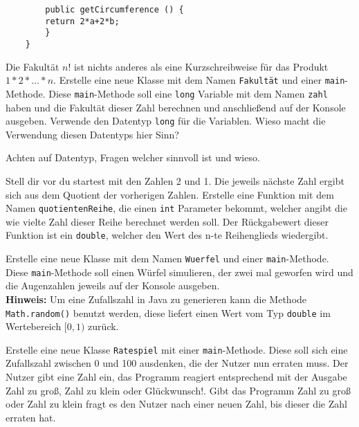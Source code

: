 \begin{questions}
\begin{parts}
\begin{solution}
\begin{lstlisting}
        public getCircumference () {
        return 2*a+2*b;
        }
    }
        \end{lstlisting}
    \end{solution}
\end{parts}

Die Fakultät $n!$ ist nichts anderes als eine Kurzschreibweise für das Produkt $1*2*...*n$.
Erstelle eine neue Klasse mit dem Namen \texttt{Fakult\"at} und einer \texttt{main}-Methode. Diese \texttt{main}-Methode soll eine \texttt{long} Variable mit dem Namen \texttt{zahl} haben und die Fakult\"at dieser Zahl berechnen und anschließend auf der Konsole ausgeben. Verwende den Datentyp \texttt{long} f\"ur die Variablen. Wieso macht die Verwendung diesen Datentyps hier Sinn?

\begin{solution}
    Achten auf Datentyp, Fragen welcher sinnvoll ist und wieso.
\end{solution}

Stell dir vor du startest mit den Zahlen 2 und 1. Die jeweils n\"achste Zahl ergibt sich aus dem Quotient der vorherigen Zahlen. Erstelle eine Funktion mit dem Namen \texttt{quotientenReihe}, die einen \texttt{int} Parameter bekommt, welcher angibt die wie vielte Zahl dieser Reihe berechnet werden soll. Der R\"uckgabewert dieser Funktion ist ein \texttt{double}, welcher den Wert des n-te Reihenglieds wiedergibt.

Erstelle eine neue Klasse mit dem Namen \texttt{Wuerfel} und einer \texttt{main}-Methode. Diese \texttt{main}-Methode soll einen W\"urfel simulieren, der zwei mal geworfen wird und die Augenzahlen jeweils auf der Konsole ausgeben.\\
\textbf{Hinweis:} Um eine Zufallszahl in Java zu generieren kann die Methode \texttt{Math.random()} benutzt werden, diese liefert einen Wert vom Typ \texttt{double} im Wertebereich $[0, 1)$    zur\"uck.

Erstelle eine neue Klasse \texttt{Ratespiel} mit einer \texttt{main}-Methode. Diese soll sich eine Zufallszahl zwischen 0 und 100 ausdenken, die der Nutzer nun erraten muss. Der Nutzer gibt eine Zahl ein, das Programm reagiert entsprechend mit der Ausgabe \glqq{}Zahl zu groß\grqq{}, \glqq{}Zahl zu klein\grqq{} oder \glqq{}Gl\"uckwunsch!\grqq{}. Gibt das Programm \glqq{}Zahl zu groß\grqq{} oder \glqq{}Zahl zu klein\grqq{} fragt es den Nutzer nach einer neuen Zahl, bis dieser die Zahl erraten hat.


\end{questions}

